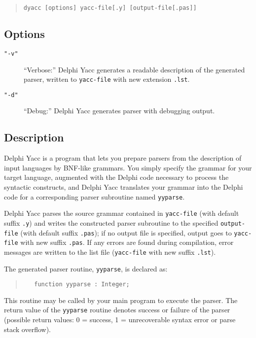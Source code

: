 \documentclass[a4paper]{article}
\begin{document}
\begin{quote}\begin{verbatim}
dyacc [options] yacc-file[.y] [output-file[.pas]]
\end{verbatim}\end{quote}

\subsection{Options}

\begin{description}
   \item[\tt"-v"]
      ``Verbose:'' Delphi Yacc generates a readable description of the generated
      parser, written to \verb"yacc-file" with new extension \verb".lst".
   \item[\tt"-d"]
      ``Debug:'' Delphi Yacc generates parser with debugging output.
\end{description}

\subsection{Description}

Delphi Yacc is a program that lets you prepare parsers from the description
of input languages by BNF-like grammars. You simply specify the grammar
for your target language, augmented with the Delphi code necessary
to process the syntactic constructs, and Delphi Yacc translates your grammar
into the Delphi code for a corresponding parser subroutine named
\verb"yyparse".

Delphi Yacc parses the source grammar contained in \verb"yacc-file" (with default
suffix \verb".y") and writes the constructed parser subroutine to the
specified \verb"output-file" (with default suffix \verb".pas"); if no output
file is specified, output goes to \verb"yacc-file" with new suffix
\verb".pas". If any errors are found during compilation, error messages are
written to the list file (\verb"yacc-file" with new suffix \verb".lst").

The generated parser routine, \verb"yyparse", is declared as:

\begin{quote}\begin{verbatim}
   function yyparse : Integer;
\end{verbatim}\end{quote}

This routine may be called by your main program to execute the parser.
The return value of the \verb"yyparse" routine denotes success or failure of
the parser (possible return values: 0 = success, 1 = unrecoverable syntax
error or parse stack overflow).
\end{document}
